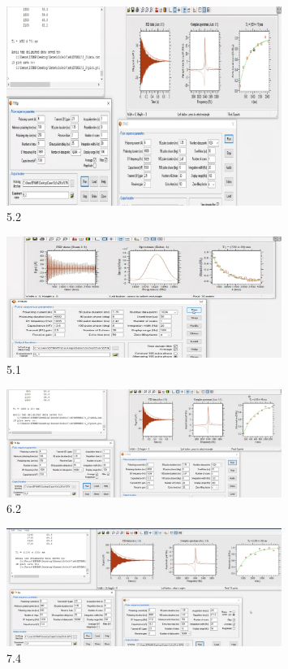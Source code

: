    \begin{figure}[H]
        \centering
        \includegraphics[width = 0.8\textwidth]{Screenshot2/5_2.jpg}
        \caption{5.2}
    \end{figure}
    \begin{figure}[H]
        \centering
        \includegraphics[width = 0.8\textwidth]{Screenshot2/5_1.jpg}
        \caption{5.1}
    \end{figure}
    \begin{figure}[H]
        \centering
        \includegraphics[width = 0.8\textwidth]{Screenshot2/6_2.jpg}
        \caption{6.2}
    \end{figure}

    \begin{figure}[H]
        \centering
        \includegraphics[width = 0.8\textwidth]{Screenshot2/7_4.jpg}
        \caption{7.4}
    \end{figure}

